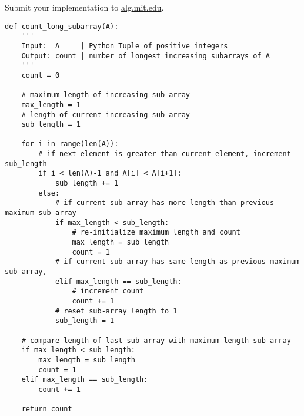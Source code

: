 \documentclass[12pt,twoside]{article}
\begin{document}
\begin{problems}
\newpage
\vfill
\problem  %
Submit your implementation to {\small\url{alg.mit.edu}}.

\begin{lstlisting}
def count_long_subarray(A):
    '''
    Input:  A     | Python Tuple of positive integers
    Output: count | number of longest increasing subarrays of A
    '''
    count = 0
    
    # maximum length of increasing sub-array
    max_length = 1
    # length of current increasing sub-array
    sub_length = 1

    for i in range(len(A)):
        # if next element is greater than current element, increment sub_length
        if i < len(A)-1 and A[i] < A[i+1]:
            sub_length += 1
        else:
            # if current sub-array has more length than previous maximum sub-array
            if max_length < sub_length:
                # re-initialize maximum length and count
                max_length = sub_length
                count = 1
            # if current sub-array has same length as previous maximum sub-array,
            elif max_length == sub_length:
                # increment count
                count += 1
            # reset sub-array length to 1
            sub_length = 1

    # compare length of last sub-array with maximum length sub-array
    if max_length < sub_length:
        max_length = sub_length
        count = 1
    elif max_length == sub_length:
        count += 1
        
    return count
\end{lstlisting}

\end{problems}
\end{document}
